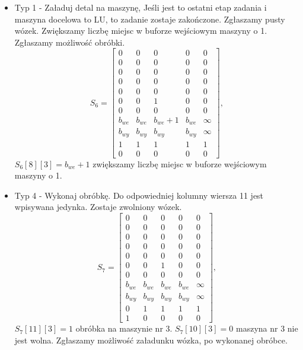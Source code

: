 \documentclass[10pt, a4paper]{article}
\begin{document}
\begin{itemize}
\begin{equation}
\begin{array}{ccccc}
0 & 0 & 1 & 0 & 0\\
0 & 0 & 1 & 0& 0\\
b_{we}& b_{we}& b_{we}& b_{we} & \infty\\
b_{wy}& b_{wy}& b_{wy}& b_{wy} & \infty\\
1& 1& 1& 1 & 1\\
0 & 0 & 0 & 0 & 0
\end{array}\right],
\end{equation}
$S_5[3][3]=0$, $S_5[6][3]=1$ mamy pusty wózek przy maszynie nr 3, $S_5[7][3]=1$ mamy detal w buforze wejściowym maszyny nr 3.
\item Typ 1 - Załaduj detal na maszynę,
Jeśli jest to ostatni etap zadania i maszyna docelowa to LU, to zadanie zostaje zakończone. Zgłaszamy pusty wózek. Zwiększamy liczbę miejsc w buforze wejściowym maszyny o 1. Zgłaszamy możliwość obróbki.
\begin{equation}
S_6=\left[\begin{array}{ccccc}
0 & 0 & 0 & 0&0\\
0 & 0 & 0 & 0 & 0\\
0 & 0 & 0 & 0& 0\\
0 & 0 & 0 & 0& 0\\
0 & 0 & 0 & 0& 0\\
0 & 0 & 1 & 0 & 0\\
0 & 0 & 0 & 0& 0\\
b_{we}& b_{we}& b_{we}+1& b_{we} & \infty\\
b_{wy}& b_{wy}& b_{wy}& b_{wy} & \infty\\
1& 1& 1& 1 & 1\\
0 & 0 & 0 & 0 & 0
\end{array}\right],
\end{equation}
$S_6[8][3]=b_{we}+1$ zwiększamy liczbę miejsc w buforze wejściowym maszyny o 1.


\item Typ 4 - Wykonaj obróbkę.
Do odpowiedniej kolumny wiersza 11 jest wpisywana jedynka. Zostaje zwolniony wózek. 
\begin{equation}
S_7=\left[\begin{array}{ccccc}
0 & 0 & 0 & 0&0\\
0 & 0 & 0 & 0 & 0\\
0 & 0 & 0 & 0& 0\\
0 & 0 & 0 & 0& 0\\
0 & 0 & 0 & 0& 0\\
0 & 0 & 1 & 0 & 0\\
0 & 0 & 0 & 0& 0\\
b_{we}& b_{we}& b_{we}& b_{we} & \infty\\
b_{wy}& b_{wy}& b_{wy}& b_{wy} & \infty\\
0 & 1& 1& 1 & 1\\
1 & 0 & 0 & 0 & 0
\end{array}\right],
\end{equation}
$S_7[11][3]=1$ obróbka na maszynie nr 3. $S_7[10][3]=0$ maszyna nr 3 nie jest wolna. Zgłaszamy możliwość załadunku wózka, po wykonanej obróbce.
\end{itemize}
\end{document}
